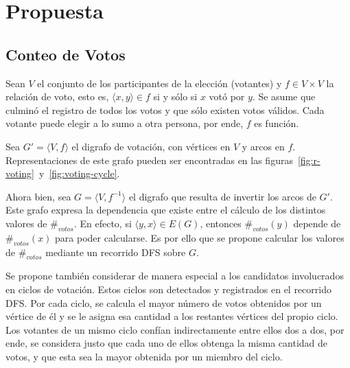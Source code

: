 \chapter{Propuesta}\label{chapter:proposal}

\newcommand{\dfscaption}{\hyperref[algo:dfs]{DFS-Votos}}
\newcommand{\cyclevotescaption}{\hyperref[algo:votes-cycles]{Reasignar-Votos-en-Todos-los-Ciclos}}
\newcommand{\dfsvisitcaption}{\hyperref[algo:dfs-visit]{DFS-Votos-Visita}}
\newcommand{\initdfsvertices}{\hyperref[algo:init-dfs-vertices]{Inicializar-Propiedades-de-V\'ertices}}
\newcommand{\maxincyclecaption}{\hyperref[algo:max-in-cycle]{M\'ax-Votos-en-Ciclo}}
\newcommand{\setvotestoallincyclecaption}{\hyperref[algo:set-votes-all-in-cycle]{Reasignar-Votos-en-Ciclo}}


\section{Conteo de Votos}
Sean $V$ el conjunto de los participantes  de la elecci\'on (votantes) y $f \in V \times V$ la relaci\'on de voto, esto es, $ \langle x, y \rangle \in f $ si y s\'olo si $x$ vot\'o por $ y $.  Se asume que culmin\'o el registro de todos los votos y que s\'olo existen votos v\'alidos. Cada votante puede elegir a lo sumo a otra persona, por ende, $f$ es funci\'on.

Sea $G' = \langle V, f \rangle$ el digrafo de votaci\'on, con v\'ertices en $V$ y arcos en $f$. Representaciones de este grafo pueden ser encontradas en las figuras~\ref{fig:r-voting}~y~\ref{fig:voting-cycle}. 

Ahora bien, sea $G = \langle V, f^{-1} \rangle$ el digrafo que resulta de invertir los arcos de $G'$. Este grafo expresa la dependencia que existe entre el c\'alculo de los distintos valores de $\#_{votos}$. En efecto, si $\langle y, x \rangle \in E(G)$, entonces $\#_{votos}(y)$ depende de $\#_{votos}(x)$ para poder calcularse. Es por ello que se propone calcular los valores de $\#_{votos}$ mediante un recorrido DFS sobre $G$. 

Se propone tambi\'en considerar de manera especial a los candidatos involucrados en ciclos de votaci\'on. Estos ciclos son detectados y registrados en el recorrido DFS. Por cada ciclo, se calcula el mayor n\'umero de votos obtenidos por un v\'ertice de \'el y se le asigna esa cantidad a los restantes v\'ertices del propio ciclo. Los votantes de un mismo ciclo conf\'ian indirectamente entre ellos dos a dos, por ende, se considera justo que cada uno de ellos obtenga la misma cantidad de votos, y que esta sea la mayor obtenida por un miembro del ciclo.

